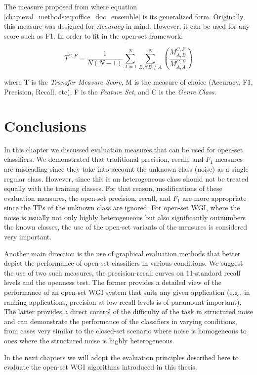 The measure proposed from \parencite{finn2006learning} where equation \ref{chap:eval_methods:eq:office_doc_ensemble} is its generalized form. Originally, this measure was designed for \textit{Accuracy} in mind. However, it can be used for any score such as F1. In order to fit in the open-set framework.

\begin{equation} \label{chap:eval_methods:eq:office_doc_ensemble}
	T^{C,F} = \frac{1}{N(N-1)} \sum_{A=1}^{N} \sum_{B, \forall B \neq A}^{N} \left(  \frac{M^{C,F}_{A,B}}{M^{C,F}_{A,A}} \right)
\end{equation}

\noindent	
where T is the \textit{Transfer Measure Score}, M is the measure of choice (Accuracy, F1, Precision, Recall, etc), F is the \textit{Feature Set}, and C is the \textit{Genre Class}. 


\section{Conclusions}

In this chapter we discussed evaluation measures that can be used for open-set classifiers. We demonstrated that traditional precision, recall, and $F_{1}$ measures are misleading since they take into account the unknown class (noise) as a single regular class. However, since this is an heterogeneous class should not be treated equally with the training classes. For that reason, modifications of these evaluation measures, the open-set precision, recall, and $F_{1}$ are more appropriate since the TPs of the unknown class are ignored. For open-set WGI, where the noise is usually not only highly heterogeneous but also significantly outnumbers the known classes, the use of the open-set variants of the measures is considered very important.

Another main direction is the use of graphical evaluation methods that better depict the performance of open-set classifiers in various conditions. We suggest the use of two such measures, the precision-recall curves on 11-standard recall levels and the openness test. The former provides a detailed view of the performance of an open-set WGI system that suits any given application (e.g., in ranking applications, precision at low recall levels is of paramount important). The latter provides a direct control of the difficulty of the task in structured noise and can demonstrate the performance of the classifiers in varying conditions, from cases very similar to the closed-set scenario where noise is homogeneous to ones where the structured noise is highly heterogeneous.

In the next chapters we will adopt the evaluation principles described here to evaluate the open-set WGI algorithms introduced in this thesis.
